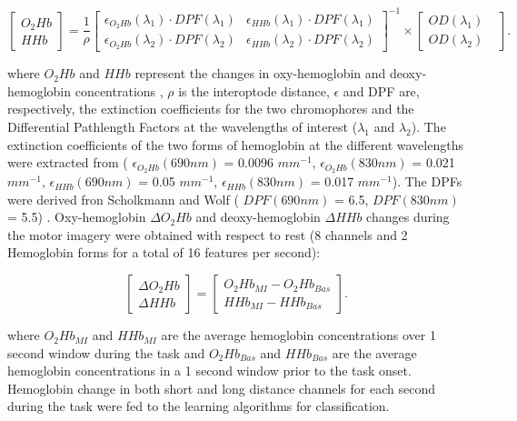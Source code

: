 \documentclass[12pt ]{iopart}
\begin{document}
\begin{equation}
\begin{bmatrix}
O_2Hb\\
HHb
\end{bmatrix}
=
\frac{1}{\rho}\begin{bmatrix}
\epsilon_{O_2Hb}(\lambda_1)\cdot DPF(\lambda_1)&\epsilon_{HHb}(\lambda_1)\cdot DPF(\lambda_1)\\
\epsilon_{O_2Hb}(\lambda_2)\cdot DPF(\lambda_2)&\epsilon_{HHb}(\lambda_2)\cdot DPF(\lambda_2)
\end{bmatrix}^{-1}\times
\begin{bmatrix}
OD(\lambda_1)&\\
OD(\lambda_2)
\end{bmatrix}
.
\end{equation}

where $O_{2}Hb$ and $HHb$ represent the changes in oxy-hemoglobin and deoxy-hemoglobin concentrations , $\rho$ is the interoptode distance, $\epsilon$  and DPF are, respectively, the extinction coefficients for the two chromophores and the Differential Pathlength Factors at the wavelengths of interest ($\lambda _{1}$ and $\lambda _{2}$). The extinction coefficients of the two forms of hemoglobin at the different wavelengths  were extracted from \parencite{zijlstra1991absorption} ( $\epsilon_{O_{2}Hb}(690nm)$ = 0.0096 $mm^{-1}$, $\epsilon_{O_{2}Hb}(830nm)$ = 0.021 $mm^{-1}$, $\epsilon_{HHb}(690nm)$ = 0.05 $mm^{-1}$, $\epsilon_{HHb}(830nm)$ = 0.017 $mm^{-1}$).  The DPFs were derived fron Scholkmann and Wolf  ( $DPF(690nm)$ = 6.5, $DPF(830nm)$ = 5.5) \parencite{scholkmann2013general}.
Oxy-hemoglobin $\Delta O_{2}Hb$ and deoxy-hemoglobin $\Delta HHb$ changes during the motor imagery were obtained  with respect to rest (8 channels and 2 Hemoglobin forms for a total of 16 features per second):

 \begin{equation}
\begin{bmatrix}
\Delta O_2Hb\\
\Delta HHb
\end{bmatrix}
=
\begin{bmatrix}
O_2Hb_{MI}-O_2Hb_{Bas}\\
HHb_{MI}-HHb_{Bas}
\end{bmatrix}
.
\end{equation}

where $O_{2}Hb_{MI}$ and $HHb_{MI}$ are the average hemoglobin concentrations over 1 second window during the task and $O_{2}Hb_{Bas}$ and $HHb_{Bas}$ are the average hemoglobin concentrations in a 1 second window prior to the task onset.
Hemoglobin change  in both short and long distance channels for each second during the task were fed to the learning algorithms for classification. 
\end{document}
